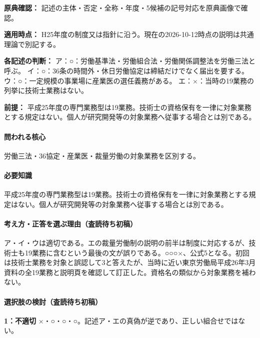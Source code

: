 \noindent\textbf{原典確認：} 記述の主体・否定・全称・年度・5候補の記号対応を原典画像で確認。\par

\noindent\textbf{適用時点：} H25年度の制度又は指針に沿う。現在の2026-10-12時点の説明は共通理論で別記する。\par

\noindent\textbf{各記述の判断：} ア：○：労働基準法・労働組合法・労働関係調整法を労働三法と呼ぶ。 イ：○：36条の時間外・休日労働協定は締結だけでなく届出を要する。 ウ：○：一定規模の事業場に産業医の選任義務がある。 エ：×：当時の19業務の列挙に技術士業務はない。\par

\noindent\textbf{前提：} 平成25年度の専門業務型は19業務。技術士の資格保有を一律に対象業務とする規定はない。個人が研究開発等の対象業務へ従事する場合とは別である。\par

\paragraph{問われる核心} 労働三法・36協定・産業医・裁量労働の対象業務を区別する。

\paragraph{必要知識} 平成25年度の専門業務型は19業務。技術士の資格保有を一律に対象業務とする規定はない。個人が研究開発等の対象業務へ従事する場合とは別である。

\paragraph{考え方・正答を選ぶ理由（査読待ち初稿）} ア・イ・ウは適切である。エの裁量労働制の説明の前半は制度に対応するが、技術士も19業務に含むという最後の文が誤りである。○○○×、公式5となる。初回は技術士業務を対象と誤認して3と答えたが、当時に近い東京労働局平成26年3月資料の全19業務と説明頁を確認して訂正した。資格名の類似から対象業務を補わない。

\paragraph{選択肢の検討（査読待ち初稿）}\mbox{}\par

\noindent\textbf{1：不適切} ×・○・○・○。記述ア・エの真偽が逆であり、正しい組合せではない。\par

